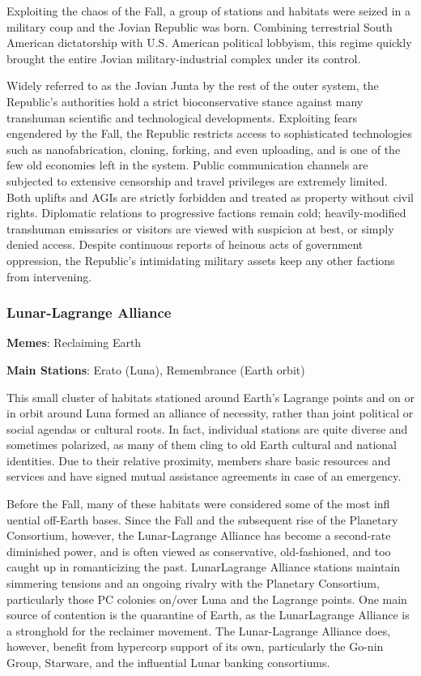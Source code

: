 Exploiting the chaos of the Fall, a group of stations and habitats
were seized in a military coup and the Jovian Republic was
born. Combining terrestrial South American dictatorship with
U.S. American political lobbyism, this regime quickly brought the
entire Jovian military-industrial complex under its control.

Widely referred to as the Jovian Junta by the rest of the outer
system, the Republic's authorities hold a strict bioconservative
stance against many transhuman scientific and technological
developments. Exploiting fears engendered by the Fall, the Republic
restricts access to sophisticated technologies such as
nanofabrication, cloning, forking, and even uploading, and is one of
the few old economies left in the system. Public communication
channels are subjected to extensive censorship and travel privileges
are extremely limited. Both uplifts and AGIs are strictly forbidden
and treated as property without civil rights. Diplomatic relations to
progressive factions remain cold; heavily-modified transhuman
emissaries or visitors are viewed with suspicion at best, or simply
denied access. Despite continuous reports of heinous acts of
government oppression, the Republic's intimidating military assets
keep any other factions from intervening.

\subsubsection{Lunar-Lagrange Alliance}
\label{sec:lunar-lagr-alli}

\textbf{Memes}: Reclaiming Earth

\textbf{Main Stations}: Erato (Luna), Remembrance (Earth orbit)


This small cluster of habitats stationed around Earth's Lagrange
points and on or in orbit around Luna formed an alliance of necessity,
rather than joint political or social agendas or cultural roots. In
fact, individual stations are quite diverse and sometimes polarized,
as many of them cling to old Earth cultural and national
identities. Due to their relative proximity, members share basic
resources and services and have signed mutual assistance agreements in
case of an emergency.

Before the Fall, many of these habitats were considered some of the
most infl uential off-Earth bases.  Since the Fall and the subsequent
rise of the Planetary Consortium, however, the Lunar-Lagrange Alliance
has become a second-rate diminished power, and is often viewed as
conservative, old-fashioned, and too caught up in romanticizing the
past. LunarLagrange Alliance stations maintain simmering tensions and
an ongoing rivalry with the Planetary Consortium, particularly those
PC colonies on/over Luna and the Lagrange points. One main source of
contention is the quarantine of Earth, as the LunarLagrange Alliance
is a stronghold for the reclaimer movement. The Lunar-Lagrange
Alliance does, however, benefit from hypercorp support of its own,
particularly the Go-nin Group, Starware, and the influential Lunar
banking consortiums.


